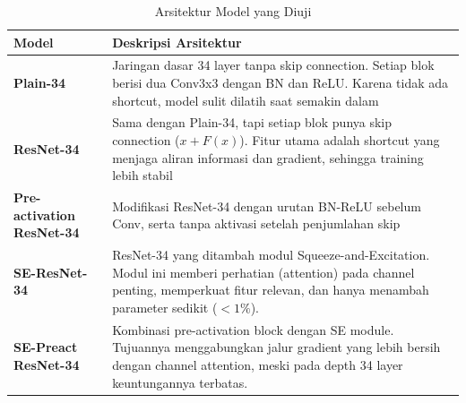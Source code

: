 \begin{table}[h]
\centering
\caption{Arsitektur Model yang Diuji}
\scriptsize
\begin{tabular}{|p{2.5cm}|>{\raggedright\arraybackslash}p{11cm}|}
\hline
\textbf{Model} & \textbf{Deskripsi Arsitektur} \\
\hline
\textbf{Plain-34} & Jaringan dasar 34 layer tanpa skip connection. Setiap blok berisi dua Conv3x3 dengan BN dan ReLU. Karena tidak ada shortcut, model sulit dilatih saat semakin dalam \\
\hline
\textbf{ResNet-34} & Sama dengan Plain-34, tapi setiap blok punya skip connection ($x+F(x)$). Fitur utama adalah shortcut yang menjaga aliran informasi dan gradient, sehingga training lebih stabil \\
\hline
\textbf{Pre-activation ResNet-34} & Modifikasi ResNet-34 dengan urutan BN-ReLU sebelum Conv, serta tanpa aktivasi setelah penjumlahan skip \\
\hline
\textbf{SE-ResNet-34} & ResNet-34 yang ditambah modul Squeeze-and-Excitation. Modul ini memberi perhatian (attention) pada channel penting, memperkuat fitur relevan, dan hanya menambah parameter sedikit ($<1\%$). \\
\hline
\textbf{SE-Preact ResNet-34} & Kombinasi pre-activation block dengan SE module. Tujuannya menggabungkan jalur gradient yang lebih bersih dengan channel attention, meski pada depth 34 layer keuntungannya terbatas. \\
\hline
\end{tabular}
\end{table}
